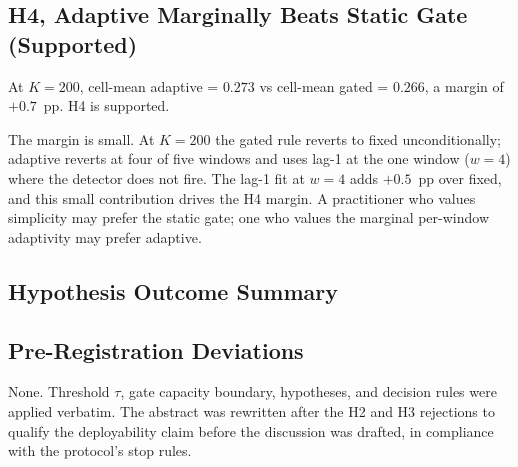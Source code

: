 \subsection{H4, Adaptive Marginally Beats Static Gate (Supported)}

At $K = 200$, cell-mean \textsf{adaptive} = $0.273$ vs cell-mean
\textsf{gated} = $0.266$, a margin of $+0.7$~pp. H4 is supported.

The margin is small. At $K = 200$ the \textsf{gated} rule reverts to
\textsf{fixed} unconditionally; \textsf{adaptive} reverts at four of
five windows and uses lag-1 at the one window ($w = 4$) where the
detector does not fire. The lag-1 fit at $w = 4$ adds $+0.5$~pp over
fixed, and this small contribution drives the H4 margin. A
practitioner who values simplicity may prefer the static gate; one
who values the marginal per-window adaptivity may prefer
\textsf{adaptive}.

\subsection{Hypothesis Outcome Summary}



\subsection{Pre-Registration Deviations}

None. Threshold $\tau$, gate capacity boundary, hypotheses, and
decision rules were applied verbatim. The abstract was rewritten
after the H2 and H3 rejections to qualify the deployability claim
before the discussion was drafted, in compliance with the protocol's
stop rules.
